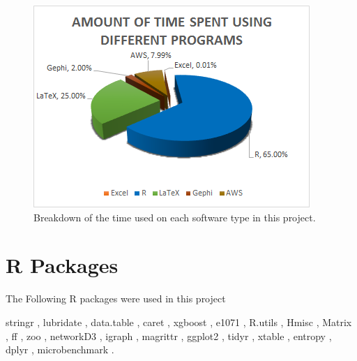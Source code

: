 \begin{figure}
    \centering
    \includegraphics[width = \textwidth]{Figures/Appendix/SoftwareType}
    \caption[Software used]{Breakdown of the time used on each software type in this project.}
    \label{fig:SofwareType}
\end{figure}


\section{R Packages}
\label{sec:packages}
The Following R packages were used in this project

stringr \cite{wickham2015}, lubridate \cite{grolemund2011}, data.table \cite{dowle2015}, caret \cite{fromjedwing2016}, xgboost \cite{chen2016}, e1071 \cite{meyer2015}, R.utils \cite{bengtsson2016}, Hmisc \cite{harrelljr2016}, Matrix \cite{bates2016}, ff \cite{adler2014}, zoo \cite{zeileis2005}, networkD3 \cite{gandrud2016}, igraph \cite{csardi2006} \cite{csrdi2006}, magrittr \cite{bache2014}, ggplot2 \cite{wickham2009}, tidyr \cite{wickham2016}, xtable \cite{dahl2016}, entropy \cite{hausser2014}, dplyr \cite{wickham2016a}, microbenchmark \cite{mersmann2015}.



